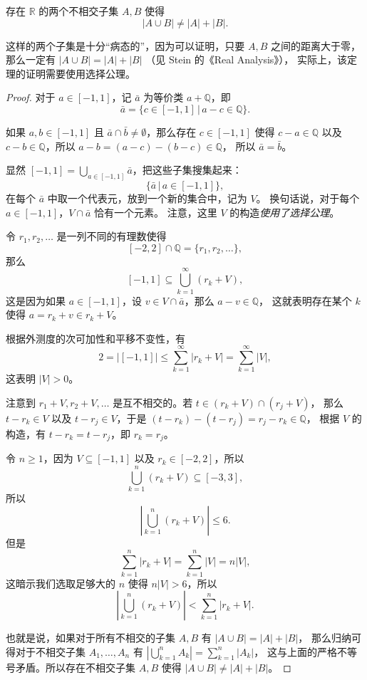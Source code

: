 \documentclass[fontset=none]{Notes}
\newcommand{\abs}[1]{\left|#1\right|}
\begin{document}
\begin{theorem}\label{thm:Vitali set}
  存在 $\mathbb{R}$ 的两个不相交子集 $A,B$ 使得
  \[
    \abs{A\cup B}\neq\abs{A}+\abs{B}.
  \]
\end{theorem}
\begin{remark}
  这样的两个子集是十分“病态的”，因为可以证明，只要 $A,B$ 之间的距离大于零，
  那么一定有 $\abs{A\cup B}=\abs{A}+\abs{B}$ （见 Stein 的《Real Analysis》），
  实际上，该定理的证明需要使用选择公理。
\end{remark}
\begin{proof}
  对于 $a\in [-1,1]$，记 $\bar a$ 为等价类 $a+\mathbb{Q}$，即
  \[
    \bar a=\{c\in [-1,1]\,|\, a-c\in \mathbb{Q}\}.
  \]

  如果 $a,b\in[-1,1]$ 且 $\bar a\cap\bar b\neq\emptyset$，那么存在 $c\in [-1,1]$
  使得 $c-a\in \mathbb{Q}$ 以及 $c-b\in \mathbb{Q}$，所以 $a-b=(a-c)-(b-c)\in \mathbb{Q}$，
  所以 $\bar a=\bar b$。

  显然 $[-1,1]=\bigcup_{a\in[-1,1]}\bar a$，把这些子集搜集起来：
  \[
    \{\bar a\,|\, a\in[-1,1]\},
  \]
  在每个 $\bar a$ 中取一个代表元，放到一个新的集合中，记为 $V$。
  换句话说，对于每个 $a\in [-1,1]$，$V\cap\bar a$ 恰有一个元素。
  注意，这里 $V$ 的构造\emph{使用了选择公理}。

  令 $r_1,r_2,\dots$ 是一列不同的有理数使得
  \[
    [-2,2]\cap \mathbb{Q}=\{r_1,r_2,\dots\},
  \]
  那么
  \[
    [-1,1]\subseteq\bigcup_{k=1}^\infty (r_k+V),
  \]
  这是因为如果 $a\in [-1,1]$，设 $v\in V\cap \bar a$，那么 $a-v\in \mathbb{Q}$，
  这就表明存在某个 $k$ 使得 $a=r_k+v\in r_k+V$。

  根据外测度的次可加性和平移不变性，有
  \[
    2=\abs{[-1,1]}\leq\sum_{k=1}^\infty \abs{r_k+V}=\sum_{k=1}^\infty\abs{V},
  \]
  这表明 $\abs{V}>0$。

  注意到 $r_1+V,r_2+V,\dots$ 是互不相交的。若 $t\in (r_k+V)\cap (r_j+V)$，
  那么 $t-r_k\in V$ 以及 $t-r_j\in V$，于是 $(t-r_k)-(t-r_j)=r_j-r_k\in \mathbb{Q}$，
  根据 $V$ 的构造，有 $t-r_k=t-r_j$，即 $r_k=r_j$。

  令 $n\geq 1$，因为 $V\subseteq [-1,1]$ 以及 $r_k\in [-2,2]$，所以
  \[
    \bigcup_{k=1}^n(r_k+V)\subseteq [-3,3],
  \]
  所以
  \[
    \abs{\bigcup_{k=1}^n(r_k+V)}\leq 6.
  \]  
  但是
  \[
    \sum_{k=1}^n\abs{r_k+V}=\sum_{k=1}^n\abs{V}=n\abs{V},
  \]
  这暗示我们选取足够大的 $n$ 使得 $n\abs{V}>6$，所以 
  \[
    \abs{\bigcup_{k=1}^n(r_k+V)}<\sum_{k=1}^n\abs{r_k+V}.
  \]

  也就是说，如果对于所有不相交的子集 $A,B$ 有 $\abs{A\cup B}=\abs{A}+\abs{B}$，
  那么归纳可得对于不相交子集 $A_1,\dots,A_n$ 有 $\abs{\bigcup_{k=1}^n A_k}=\sum_{k=1}^n\abs{A_k}$，
  这与上面的严格不等号矛盾。所以存在不相交子集 $A,B$ 使得 $\abs{A\cup B}\neq\abs{A}+\abs{B}$。
\end{proof}
\end{document}
